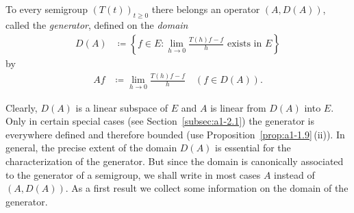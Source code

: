 \begin{definition}\label{def:a1-1.5}
To every semigroup $(T(t))_{t \geq 0}$ there belongs an operator $(A,D(A))$, 
called the \emph{generator}, defined on the \emph{domain}
\begin{align*}
    D(A) &\coloneqq \left\{ f \in E \colon \lim_{h\to0} \frac{T(h)f - f}{h} 
             \text{ exists in } E \right\}
\end{align*}
by
\begin{align*}
    Af &\coloneqq \lim_{h\to0} \frac{T(h)f - f}{h} \quad (f \in D(A)).
\end{align*}
\end{definition}
Clearly, $D(A)$ is a linear subspace of\/ $E$ and $A$ is linear from $D(A)$ into $E$.
Only in certain special cases (see Section~\ref{subsec:a1-2.1}) the generator
is everywhere defined and therefore bounded (use Proposition~\ref{prop:a1-1.9}\,(ii)). 
In general, the precise extent of the domain $D(A)$ is essential for the characterization of the generator.
But since the domain is canonically associated to the generator of a semigroup, we shall write in most cases $A$ instead of\/ $(A,D(A))$.
As a first result we collect some information on the domain of the generator.
